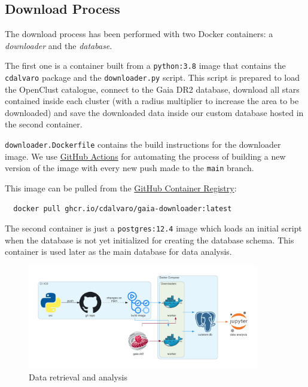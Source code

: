 \documentclass[11pt, a4paper, english]{book}
\begin{document}
\subsection{Download Process}

The download process has been performed with two Docker containers: a \emph{downloader} and the \emph{database}.

The first one is a container built from a \verb|python:3.8| image that contains the \verb|cdalvaro| package and the \verb|downloader.py| script.
This script is prepared to load the OpenClust catalogue, connect to the Gaia DR2 database, download all stars contained inside each cluster
(with a radius multiplier to increase the area to be downloaded) and save the downloaded data inside our custom database hosted in the second container.

\verb|downloader.Dockerfile| contains the build instructions for the downloader image. We use \href{https://github.com/features/actions}{GitHub Actions}
for automating the process of building a new version of the image with every new push made to the \verb|main| branch.

This image can be pulled from the \href{https://github.blog/2020-09-01-introducing-github-container-registry/}{GitHub Container Registry}:

\begin{verbatim}
  docker pull ghcr.io/cdalvaro/gaia-downloader:latest
\end{verbatim}

The second container is just a \verb|postgres:12.4| image which loads an initial script when the database is not yet initialized for creating the
database schema. This container is used later as the main database for data analysis.

\begin{figure}[htbp]
  \centering
  \includegraphics[width=0.9\textwidth]{../figures/services_diagram.pdf}
  \caption{Data retrieval and analysis}
  \label{fig:services_diagram}
\end{figure}
\end{document}
